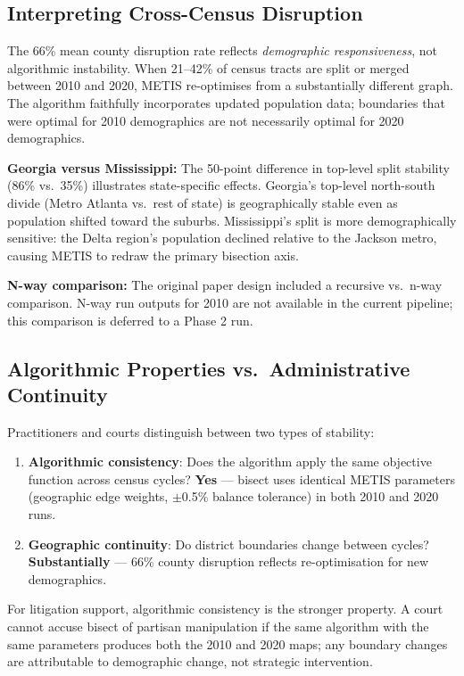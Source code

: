 \subsection{Interpreting Cross-Census Disruption}

The 66\% mean county disruption rate reflects \emph{demographic responsiveness}, not algorithmic instability. When 21--42\% of census tracts are split or merged between 2010 and 2020, METIS re-optimises from a substantially different graph. The algorithm faithfully incorporates updated population data; boundaries that were optimal for 2010 demographics are not necessarily optimal for 2020 demographics.

\textbf{Georgia versus Mississippi:} The 50-point difference in top-level split stability (86\% vs.\ 35\%) illustrates state-specific effects. Georgia's top-level north-south divide (Metro Atlanta vs.\ rest of state) is geographically stable even as population shifted toward the suburbs. Mississippi's split is more demographically sensitive: the Delta region's population declined relative to the Jackson metro, causing METIS to redraw the primary bisection axis.

\textbf{N-way comparison:} The original paper design included a recursive vs.\ n-way comparison. N-way run outputs for 2010 are not available in the current pipeline; this comparison is deferred to a Phase 2 run.

\subsection{Algorithmic Properties vs.\ Administrative Continuity}

Practitioners and courts distinguish between two types of stability:

\begin{enumerate}
    \item \textbf{Algorithmic consistency}: Does the algorithm apply the same objective function across census cycles? \textbf{Yes} — bisect uses identical METIS parameters (geographic edge weights, $\pm$0.5\% balance tolerance) in both 2010 and 2020 runs.

    \item \textbf{Geographic continuity}: Do district boundaries change between cycles? \textbf{Substantially} — 66\% county disruption reflects re-optimisation for new demographics.
\end{enumerate}

For litigation support, algorithmic consistency is the stronger property. A court cannot accuse bisect of partisan manipulation if the same algorithm with the same parameters produces both the 2010 and 2020 maps; any boundary changes are attributable to demographic change, not strategic intervention.

